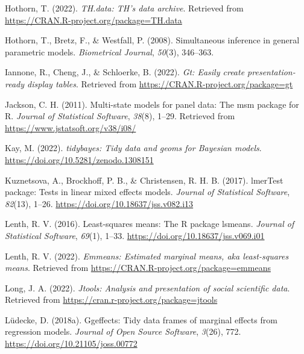 \documentclass[
  english,
  man]{apa6}
\newlength{\cslhangindent}
\newlength{\cslentryspacingunit} %
\newenvironment{CSLReferences}[2] %
 {%
  \setlength{\parindent}{0pt}
  \ifodd #1
  \let\oldpar\par
  \def\par{\hangindent=\cslhangindent\oldpar}
  \fi
  \setlength{\parskip}{#2\cslentryspacingunit}
 }%
 {}
\begin{document}
\begin{CSLReferences}{1}{0}
\leavevmode{}%
Hothorn, T. (2022). \emph{TH.data: TH's data archive}. Retrieved from \url{https://CRAN.R-project.org/package=TH.data}

\leavevmode{}%
Hothorn, T., Bretz, F., \& Westfall, P. (2008). Simultaneous inference in general parametric models. \emph{Biometrical Journal}, \emph{50}(3), 346--363.

\leavevmode{}%
Iannone, R., Cheng, J., \& Schloerke, B. (2022). \emph{Gt: Easily create presentation-ready display tables}. Retrieved from \url{https://CRAN.R-project.org/package=gt}

\leavevmode{}%
Jackson, C. H. (2011). Multi-state models for panel data: The {msm} package for {R}. \emph{Journal of Statistical Software}, \emph{38}(8), 1--29. Retrieved from \url{https://www.jstatsoft.org/v38/i08/}

\leavevmode{}%
Kay, M. (2022). \emph{{tidybayes}: Tidy data and geoms for {Bayesian} models}. \url{https://doi.org/10.5281/zenodo.1308151}

\leavevmode{}%
Kuznetsova, A., Brockhoff, P. B., \& Christensen, R. H. B. (2017). {lmerTest} package: Tests in linear mixed effects models. \emph{Journal of Statistical Software}, \emph{82}(13), 1--26. \url{https://doi.org/10.18637/jss.v082.i13}

\leavevmode{}%
Lenth, R. V. (2016). Least-squares means: The {R} package {lsmeans}. \emph{Journal of Statistical Software}, \emph{69}(1), 1--33. \url{https://doi.org/10.18637/jss.v069.i01}

\leavevmode{}%
Lenth, R. V. (2022). \emph{Emmeans: Estimated marginal means, aka least-squares means}. Retrieved from \url{https://CRAN.R-project.org/package=emmeans}

\leavevmode{}%
Long, J. A. (2022). \emph{Jtools: Analysis and presentation of social scientific data}. Retrieved from \url{https://cran.r-project.org/package=jtools}

\leavevmode{}%
Lüdecke, D. (2018a). Ggeffects: Tidy data frames of marginal effects from regression models. \emph{Journal of Open Source Software}, \emph{3}(26), 772. \url{https://doi.org/10.21105/joss.00772}


\end{CSLReferences}
\end{document}
